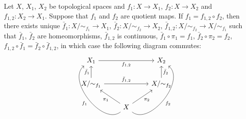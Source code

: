 \documentclass{book}
\begin{document}
	\begin{ex} 
		Let $X$, $X_1$, $X_2$ be topological spaces and $f_1:X \rightarrow X_1$, $f_2:X \rightarrow X_2$ and $f_{1,2}:X_2 \rightarrow X_1$. Suppose that $f_1$ and $f_2$ are quotient maps. If $f_1 = f_{1,2} \circ f_2$, then there exists unique $\bar{f}_1:X/{\sim_{f_1}} \rightarrow X_1$, $\bar{f}_2:X/{\sim_{f_2}} \rightarrow X_2$, $\bar{f}_{1,2}: X/{\sim_{f_2}} \rightarrow X/{\sim_{f_1}}$ such that $\bar{f}_1$, $\bar{f}_2$ are homeomorphisms, $\bar{f}_{1,2}$ is continuous, $\bar{f}_1 \circ \pi_1  = f_1$, $\bar{f}_2 \circ \pi_2  = f_2$, $f_{1,2} \circ \bar{f}_1 = \bar{f}_2 \circ \bar{f}_{1,2}$, in which case the following diagram commutes:
		\[ 
		\begin{tikzcd}
			X_1  \arrow[rr, "f_{1,2}"']   & & X_2   \\
			X/ {\sim_{f_1}} \arrow[u, "\bar{f}_1"]   \arrow[rr, "\bar{f}_{1,2}"] & &  X / {\sim_{f_2}} \arrow[u, "\bar{f}_2"']  \\
			& X   \arrow[ul, "\pi_1"] \arrow[ur, "\pi_2"'] \arrow[bend left=90]{luu}{f_1} \arrow[bend right=90, swap]{ruu}{f_2}  & 
		\end{tikzcd}
		\]
	\end{ex}
\end{document}
